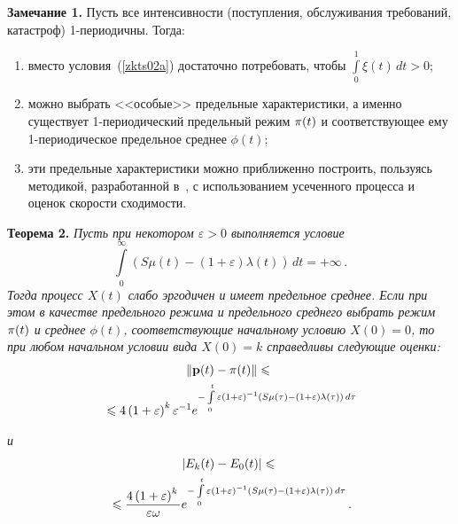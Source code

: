 \begin{multicols}{2}
\bigskip
\noindent
\textbf{Замечание 1.}
Пусть все интенсивности (по\-ступ\-ления, обслуживания требований, катастроф)
\mbox{1-пе}\-ри\-о\-дичны. Тогда:
\begin{enumerate}[(1)]
\item
вместо условия~(\ref{zkts02a}) достаточно потребовать, чтобы $\int\limits_0^1\xi(t)\,dt>0$;
\item
можно выбрать <<особые>> предельные характеристики, а именно  существует 1-пе\-ри\-о\-ди\-ческий предельный режим
${\bf \pi}(t)$ и со\-от\-вет\-ствующее ему 1-периодическое предельное среднее $\phi(t)$;
\item эти предельные характеристики можно приближенно построить, пользуясь методикой,
разработанной в~\cite{z09, z06}, с использованием усеченного процесса и оценок скорости схо\-ди\-мости.
\end{enumerate}


\medskip

\noindent
\textbf{Теорема 2.}  \textit{Пусть при некотором $\varepsilon > 0$ выполняется условие}
\begin{equation}
\int\limits_0^{\infty} \left(S\mu(t)-\left(1+\varepsilon\right)\lambda(t)\right)\, dt = +\infty\,.
\label{zkts05}
\end{equation}
\textit{Тогда процесс $X(t)$ слабо эргодичен и имеет предельное среднее. Если при этом в качестве предельного режима и предельного среднего выбрать режим ${\bf \pi}(t)$ и среднее $\phi(t)$, соответствующие начальному условию $X(0) = 0$, то
при любом начальном условии вида $X(0) = k$ справедливы следующие оценки:}
\begin{multline*}
\|{\bf p}(t) - {\bf \pi}(t)\| \le{}\\
{}\le 4\left(1+\varepsilon\right)^k \varepsilon^{-1} e^{-\int\limits_0^t
\varepsilon(1+\varepsilon)^{-1}\left(S\mu(\tau)-(1+\varepsilon)\lambda(\tau)\right)\, d\tau} %
\end{multline*}

\vspace*{-12pt}

\noindent
\textit{и}
\begin{multline*}
\left|E_k(t) - E_0(t)\right| \leqslant{}\\
{}\leqslant \displaystyle\frac{\displaystyle 4\left(1+\varepsilon\right)^k\mathstrut}{\displaystyle \varepsilon \omega\mathstrut} e^{-\int\limits_0^t
\varepsilon \left( 1+\varepsilon \right)^{-1}\left(S\mu(\tau)-(1+\varepsilon)\lambda(\tau)\right)\, d\tau}\,.
\end{multline*}



\end{multicols}

